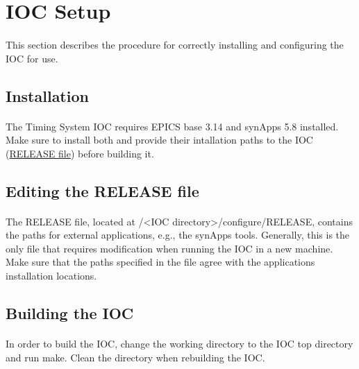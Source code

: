 \documentclass[openany]{article}
\begin{document}
\section{IOC Setup}

	\paragraph{} This section describes the procedure for correctly installing and configuring the IOC for use.

	\subsection{Installation}

		\paragraph{} The Timing System IOC requires EPICS base 3.14 and synApps 5.8 installed. Make sure to install both and provide their intallation paths to the IOC (\hyperref[sec:release-file]{RELEASE file}) before building it.

	\subsection{Editing the RELEASE file}\label{sec:release-file}

		\paragraph{} The RELEASE file, located at /\textless IOC directory\textgreater/configure/RELEASE, contains the paths for external applications, e.g., the synApps tools. Generally, this is the only file that requires modification when running the IOC in a new machine. Make sure that the paths specified in the file agree with the applications installation locations.

	\subsection{Building the IOC}

		\paragraph{} In order to build the IOC, change the working directory to the IOC top directory and run make. Clean the directory when rebuilding the IOC.
\end{document}

